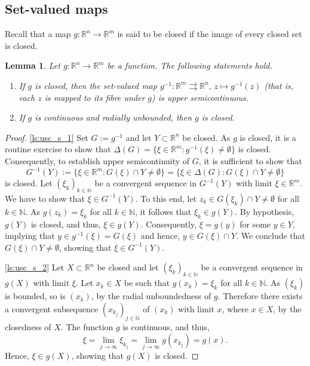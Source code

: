 \documentclass[a4paper,11pt]{article}
\newcommand{\R}{\mathbb R}
\newcommand{\N}{\mathbb N}
\numberwithin{equation}{section}
\numberwithin{figure}{section}
\numberwithin{table}{section}
\newtheorem{lemma}[theorem]{Lemma}
\begin{document}
\subsection{Set-valued maps}
%
Recall that a map $g:\R^n\to\R^m$ is said to be closed if the image of every closed set is closed.
%
\begin{lemma}\label{lem:usc}
Let $g:\R^n\to\R^m$ be a function. The following statements hold.
\begin{enumerate}[label = {\bf (\arabic*)}, ref={\rm (\arabic*)}, leftmargin = 0ex, itemindent = 4.6ex]
\item\label{ls:usc_s_1}
If $g$ is closed, then the set-valued map $g^{-1}:\R^m\rightrightarrows\R^n,\,z\mapsto g^{-1}(z)$ {\rm (}that is, each $z$ is mapped to its fibre under $g${\rm )} is upper semicontinuous.
%
\item\label{ls:usc_s_2}
If $g$ is continuous and radially unbounded, then $g$ is closed.
\end{enumerate}
\end{lemma}
%
\begin{proof}
\ref{ls:usc_s_1}
Set $G:=g^{-1}$ and let $Y\subset\R^n$ be closed. As $g$ is closed, it is a routine exercise to show
that $\Delta(G)=\{\xi\in\R^m:g^{-1}(\xi)\not=\emptyset\}$ is closed. Consequently, to establish upper
semicontinuity of $G$, it is sufficient to show that
\[
G^{-1}(Y):=\{\xi\in\R^m:G(\xi)\cap Y\not=\emptyset\}=\{\xi\in\Delta(G):G(\xi)\cap Y\not=\emptyset\}
\]
is closed. Let $(\xi_k)_{k\in\N}$ be a convergent sequence in $G^{-1}(Y)$ with limit $\xi\in\R^m$. We have to show that $\xi\in G^{-1}(Y)$. To this end, let $z_k\in G(\xi_k)\cap Y\not=\emptyset$ for all $k\in\N$. As $g(z_k)=\xi_k$ for all $k\in\N$, it follows that $\xi_k\in g(Y)$. By hypothesis, $g(Y)$ is closed, and thus, $\xi\in g(Y)$. Consequently, $\xi=g(y)$ for some $y\in Y$, implying that $y\in g^{-1}(\xi)=G(\xi)$ and hence, $y\in G(\xi)\cap Y$. We conclude that $G(\xi)\cap Y\not=\emptyset$, showing that $\xi\in G^{-1}(Y)$.

\ref{ls:usc_s_2} Let $X\subset\R^n$ be closed and let $(\xi_k)_{k\in\N}$ be a convergent sequence
in $g(X)$ with limit $\xi$. Let $x_k\in X$ be such that $g(x_k)=\xi_k$ for all $k\in\N$. As
$(\xi_k)$ is bounded, so is $(x_k)$, by the radial unboundedness of $g$. Therefore there exists
a convergent subsequence $(x_{k_j})_{j\in\N}$ of $(x_k)$ with limit $x$, where $x\in X$, by the
closedness of $X$. The function $g$ is continuous, and thus,
\[
\xi=\lim_{j\to\infty} \xi_{k_j}=\lim_{j\to\infty} g(x_{k_j})=g(x).
\]
Hence, $\xi\in g(X)$, showing that $g(X)$ is closed.
\end{proof}
%
\end{document}
